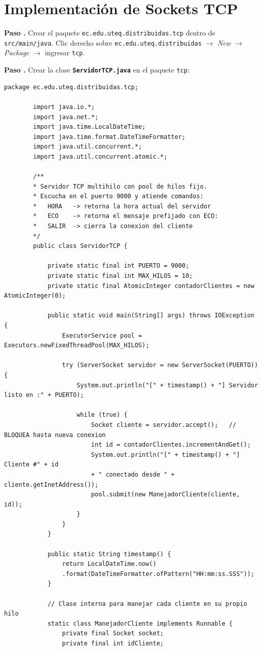 \documentclass[12pt, a4paper, openany]{book}
\newcounter{paso}[section]
\newcommand{\paso}[1]{%
	\stepcounter{paso}%
	\medskip\noindent
	\begin{tcolorbox}[enhanced, colback=white, colframe=practiceBlue,
		boxrule=0.8pt, arc=3pt, left=6pt, right=6pt, top=4pt, bottom=4pt,
		before upper={\noindent}]
		\textcolor{practiceBlue}{\textbf{Paso \arabic{paso}.}} #1
	\end{tcolorbox}%
}
\newcommand{\code}[1]{\texttt{\small#1}}
\newcommand{\archivo}[1]{\texttt{\textbf{#1}}}
\newcommand{\menu}[1]{\textit{#1}}
\begin{document}
	\section{Implementación de Sockets TCP}
	
	\paso{Crear el paquete \code{ec.edu.uteq.distribuidas.tcp} dentro de
		\code{src/main/java}. Clic derecho sobre \code{ec.edu.uteq.distribuidas}
		$\to$ \menu{New $\to$ Package} $\to$ ingresar \code{tcp}.}
	
	\paso{Crear la clase \archivo{ServidorTCP.java} en el paquete \code{tcp}:}
	
	\begin{lstlisting}[style=JavaStyle, caption={ServidorTCP.java --- Servidor multihilo con ThreadPool}]
		package ec.edu.uteq.distribuidas.tcp;
		
		import java.io.*;
		import java.net.*;
		import java.time.LocalDateTime;
		import java.time.format.DateTimeFormatter;
		import java.util.concurrent.*;
		import java.util.concurrent.atomic.*;
		
		/**
		* Servidor TCP multihilo con pool de hilos fijo.
		* Escucha en el puerto 9000 y atiende comandos:
		*   HORA   -> retorna la hora actual del servidor
		*   ECO    -> retorna el mensaje prefijado con ECO:
		*   SALIR  -> cierra la conexion del cliente
		*/
		public class ServidorTCP {
			
			private static final int PUERTO = 9000;
			private static final int MAX_HILOS = 10;
			private static final AtomicInteger contadorClientes = new AtomicInteger(0);
			
			public static void main(String[] args) throws IOException {
				ExecutorService pool = Executors.newFixedThreadPool(MAX_HILOS);
				
				try (ServerSocket servidor = new ServerSocket(PUERTO)) {
					System.out.println("[" + timestamp() + "] Servidor listo en :" + PUERTO);
					
					while (true) {
						Socket cliente = servidor.accept();   // BLOQUEA hasta nueva conexion
						int id = contadorClientes.incrementAndGet();
						System.out.println("[" + timestamp() + "] Cliente #" + id
						+ " conectado desde " + cliente.getInetAddress());
						pool.submit(new ManejadorCliente(cliente, id));
					}
				}
			}
			
			public static String timestamp() {
				return LocalDateTime.now()
				.format(DateTimeFormatter.ofPattern("HH:mm:ss.SSS"));
			}
			
			// Clase interna para manejar cada cliente en su propio hilo
			static class ManejadorCliente implements Runnable {
				private final Socket socket;
				private final int idCliente;
				

\end{lstlisting}
\end{document}
